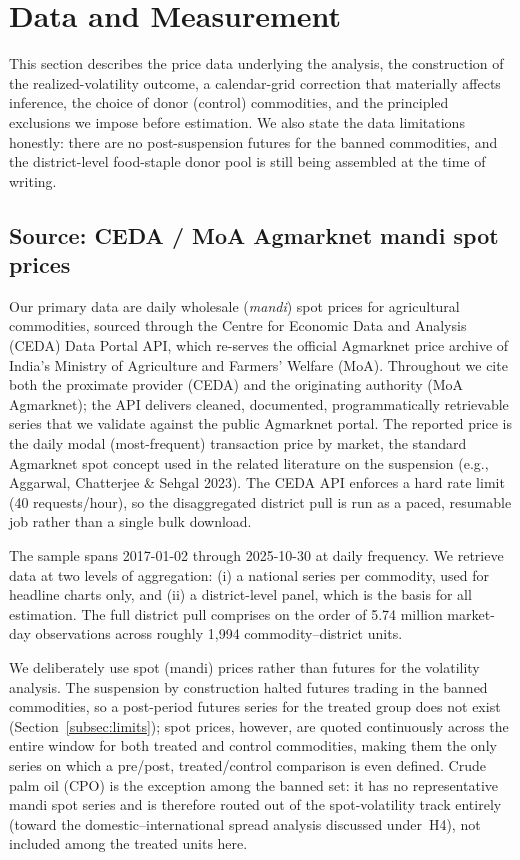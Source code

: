 \section{Data and Measurement}
\label{sec:data}

This section describes the price data underlying the analysis, the construction of the
realized-volatility outcome, a calendar-grid correction that materially affects inference, the
choice of donor (control) commodities, and the principled exclusions we impose before estimation.
We also state the data limitations honestly: there are no post-suspension futures for the banned
commodities, and the district-level food-staple donor pool is still being assembled at the time of
writing.

\subsection{Source: CEDA / MoA Agmarknet mandi spot prices}

Our primary data are daily wholesale (\emph{mandi}) spot prices for agricultural commodities,
sourced through the Centre for Economic Data and Analysis (CEDA) Data Portal API, which re-serves
the official Agmarknet price archive of India's Ministry of Agriculture and Farmers' Welfare (MoA).
Throughout we cite both the proximate provider (CEDA) and the originating authority (MoA
Agmarknet); the API delivers cleaned, documented, programmatically retrievable series that we
validate against the public Agmarknet portal. The reported price is the daily modal (most-frequent)
transaction price by market, the standard Agmarknet spot concept used in the related literature on
the suspension (e.g., Aggarwal, Chatterjee \& Sehgal 2023). The CEDA API enforces a hard rate limit
(40 requests/hour), so the disaggregated district pull is run as a paced, resumable job rather than
a single bulk download.

The sample spans 2017-01-02 through 2025-10-30 at daily frequency. We retrieve data at two levels of
aggregation: (i) a national series per commodity, used for headline charts only, and (ii) a
district-level panel, which is the basis for all estimation. The full district pull comprises on the
order of 5.74 million market-day observations across roughly 1{,}994 commodity--district units.

We deliberately use spot (mandi) prices rather than futures for the volatility analysis. The
suspension by construction halted futures trading in the banned commodities, so a post-period
futures series for the treated group does not exist (Section~\ref{subsec:limits}); spot prices,
however, are quoted continuously across the entire window for both treated and control commodities,
making them the only series on which a pre/post, treated/control comparison is even defined. Crude
palm oil (CPO) is the exception among the banned set: it has no representative mandi spot series and
is therefore routed out of the spot-volatility track entirely (toward the domestic--international
spread analysis discussed under~H4), not included among the treated units here.

